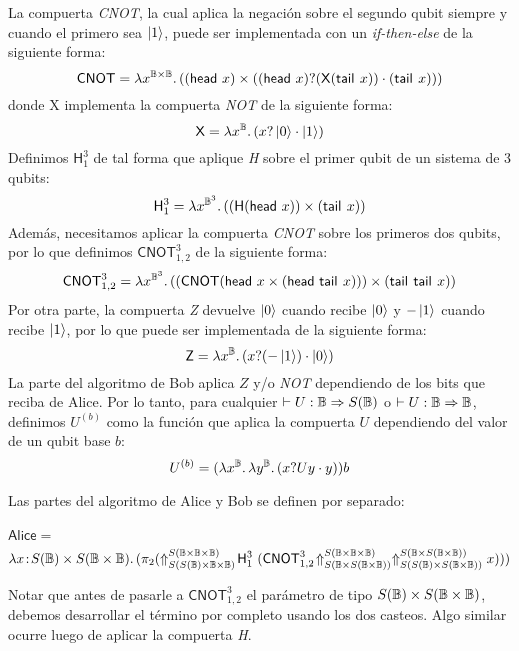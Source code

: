La compuerta \textit{CNOT}, la cual aplica la negación sobre el segundo qubit siempre y cuando el primero sea \( \ket{1} \), puede ser implementada con un \textit{if-then-else} de la siguiente forma:
\[
	\mathsf{CNOT} = \lambda x^{\mathbb{B} \times \mathbb{B}}\ldotp((\mathsf{head}~x) \times ((\mathsf{head}~x)? (\mathsf{X} (\mathsf{tail}^{}~x)) \cdot (\mathsf{tail}^{}~x)))
\]
donde \textsf{X} implementa la compuerta \textit{NOT} de la siguiente forma:
\[
	\mathsf{X} = \lambda x^{\mathbb{B}}\ldotp(x? \ket{0} \cdot \ket{1})
\]
Definimos \( \mathsf{H}_1^3 \) de tal forma que aplique \textit{H} sobre el primer qubit de un sistema de 3 qubits:
\[
	\mathsf{H}_1^3 = \lambda x^{\mathbb{B}^3}\ldotp((\mathsf{H} (\mathsf{head}~x)) \times (\mathsf{tail}^{}~x))
\]
Además, necesitamos aplicar la compuerta \textit{CNOT} sobre los primeros dos qubits, por lo que definimos \( \mathsf{CNOT}_{1,2}^3 \) de la siguiente forma:
\[
	\mathsf{CNOT}_{1,2}^3 = \lambda x^{\mathbb{B}^3}\ldotp((\mathsf{CNOT} (\mathsf{head}~x \times (\mathsf{head}~\mathsf{tail}^{}~x))) \times (\mathsf{tail}^{}~\mathsf{tail}^{}~x))
\]
Por otra parte, la compuerta \textit{Z} devuelve \( \ket{0} \) cuando recibe \( \ket{0} \) y \( - \ket{1} \) cuando recibe \( \ket{1} \), por lo que puede ser implementada de la siguiente forma:
\[
	\mathsf{Z} = \lambda x^{\mathbb{B}}\ldotp(x?  (-\ket{1})  \cdot  \ket{0})
\]
La parte del algoritmo de Bob aplica \( Z \) y/o \textit{NOT} dependiendo de los bits que reciba de Alice. Por lo tanto, para cualquier \( \vdash U : \mathbb{B} \Rightarrow S(\mathbb{B}) \) o \( \vdash U : \mathbb{B} \Rightarrow \mathbb{B} \), definimos \( U^{(b)} \) como la función que aplica la compuerta \( U \) dependiendo del valor de un qubit base \( b \):
\[
	U^{(b)} = (\lambda x^{\mathbb{B}}\ldotp\lambda y^{\mathbb{B}}\ldotp(x? Uy \cdot y)) b
\]

Las partes del algoritmo de Alice y Bob se definen por separado:\\ \\
\( \mathsf{Alice} = \)
\[
	\lambda x\!:\!S(\mathbb{B})\times S(\mathbb{B}\times
	\mathbb{B})\ldotp(\pi_{2} (\Uparrow_{S(S(\mathbb{B}) \times \mathbb{B} \times \mathbb{B})}^{S(\mathbb{B} \times \mathbb{B} \times \mathbb{B})}\!\mathsf{H}^3_1~(\mathsf{CNOT}^3_{1,2}\!\Uparrow_{S(\mathbb{B} \times S(\mathbb{B} \times \mathbb{B}))}^{S(\mathbb{B} \times \mathbb{B} \times \mathbb{B})}\Uparrow_{S(S(\mathbb{B})\times S(\mathbb{B} \times \mathbb{B}))}^{S(\mathbb{B} \times S(\mathbb{B} \times \mathbb{B}))} x)))
\]

Notar que antes de pasarle a \( \mathsf{CNOT}_{1,2}^3 \) el parámetro de tipo \( S(\mathbb{B}) \times S(\mathbb{B} \times \mathbb{B}) \), debemos desarrollar el término por completo usando los dos casteos. Algo similar ocurre luego de aplicar la compuerta \textit{H}.

